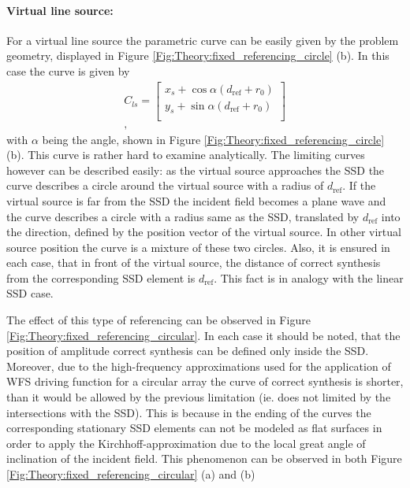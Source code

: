 \documentclass[12pt,a4paper]{article}
\newcommand{\dref}{d_{\mathrm{ref}}}
\begin{document}
\paragraph{Virtual line source:\\}
For a virtual line source the parametric curve can be easily given by the problem geometry, displayed in Figure \ref{Fig:Theory:fixed_referencing_circle} (b).
In this case the curve is given by
\begin{eqnarray}
C_{ls} =  \begin{bmatrix} x_s + \cos\alpha (\dref + r_0)\\[0.3em] y_s + \sin\alpha (\dref+r_0) \\[0.3em]    \end{bmatrix} \\,
\label{Eq:Fixed_referencing_ls_circle}
\end{eqnarray}
with $\alpha$ being the angle, shown in Figure \ref{Fig:Theory:fixed_referencing_circle} (b).
This curve is rather hard to examine analytically. 
The limiting curves however can be described easily: as the virtual source approaches the SSD the curve describes a circle around the virtual source with a radius of $\dref$. If the virtual source is far from the SSD the incident field becomes a plane wave and the curve describes a circle with a radius same as the SSD, translated by $\dref$ into the direction, defined by the position vector of the virtual source. In other virtual source position the curve is a mixture of these two circles. Also, it is ensured in each case, that in front of the virtual source, the distance of correct synthesis from the corresponding SSD element is $\dref$. This fact is in analogy with the linear SSD case.

The effect of this type of referencing can be observed in Figure \ref{Fig:Theory:fixed_referencing_circular}.
In each case it should be noted, that the position of amplitude correct synthesis can be defined only inside the SSD. Moreover, due to the high-frequency approximations used for the application of WFS driving function for a circular array the curve of correct synthesis is shorter, than it would be allowed by the previous limitation (ie. does not limited by the intersections with the SSD). This is because in the ending of the curves the corresponding stationary SSD elements can not be modeled as flat surfaces in order to apply the Kirchhoff-approximation due to the local great angle of inclination of the incident field. This phenomenon can be observed in both Figure \ref{Fig:Theory:fixed_referencing_circular} (a) and (b)
\end{document}
